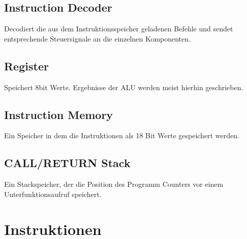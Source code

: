 \documentclass{scrartcl}
\begin{document}
\subsection{Instruction Decoder}
Decodiert die aus dem Instruktionsspeicher geladenen Befehle und sendet entsprechende Steuersignale an die einzelnen Komponenten.
\subsection{Register}
Speichert 8bit Werte. Ergebnisse der ALU werden meist hierhin geschrieben.
\subsection{Instruction Memory}
Ein Speicher in dem die Instruktionen als 18 Bit Werte gespeichert werden.
\subsection{CALL/RETURN Stack}
Ein Stackspeicher, der die Position des Programm Counters vor einem Unterfunktionsaufruf speichert.


\section{Instruktionen}
\end{document}
